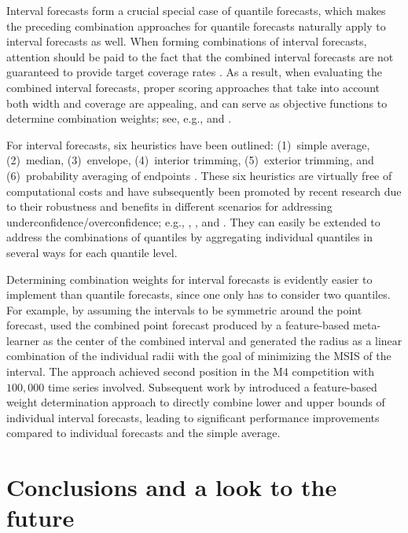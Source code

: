\documentclass[a4paper,11pt]{article}
\begin{document}
Interval forecasts form a crucial special case of quantile forecasts, which makes the preceding combination approaches for quantile forecasts naturally apply to interval forecasts as well. When forming combinations of interval forecasts, attention should be paid to the fact that the combined interval forecasts are not guaranteed to provide target coverage rates \citep{Wallis2005-yf,Timmermann2006-en,Grushka-Cockayne2020-qv}. As a result, when evaluating the combined interval forecasts, proper scoring approaches that take into account both width and coverage are appealing, and can serve as objective functions to determine combination weights; see, e.g., \citet{Gneiting2007-ij} and \citet{Jose2009-lh}.

For interval forecasts, six heuristics have been outlined: (1)~simple average, (2)~median, (3)~envelope, (4)~interior trimming, (5)~exterior trimming, and (6)~probability averaging of endpoints \citep{Park2015-zn,Gaba2017-om}. These six heuristics are virtually free of computational costs and have subsequently been promoted by recent research due to their robustness and benefits in different scenarios for addressing underconfidence/overconfidence; e.g., \citet{Smyl2019-av}, \citet{Petropoulos2020-fp}, and \citet{Grushka-Cockayne2020-qv}. They can easily be extended to address the combinations of quantiles by aggregating individual quantiles in several ways for each quantile level.

Determining combination weights for interval forecasts is evidently easier to implement than quantile forecasts, since one only has to consider two quantiles. For example, by assuming the intervals to be symmetric around the point forecast, \citet{Montero-Manso2020-tq} used the combined point forecast produced by a feature-based meta-learner as the center of the combined interval and generated the radius as a linear combination of the individual radii with the goal of minimizing the MSIS \citep[mean scaled interval score,][]{Gneiting2007-ij} of the interval. The approach achieved second position in the M4 competition with $100,000$ time series involved. Subsequent work by \citet{Wang2021-un} introduced a feature-based weight determination approach to directly combine lower and upper bounds of individual interval forecasts, leading to significant performance improvements compared to individual forecasts and the simple average.

\section{Conclusions and a look to the future}
\label{sec:conclusion}
\end{document}
